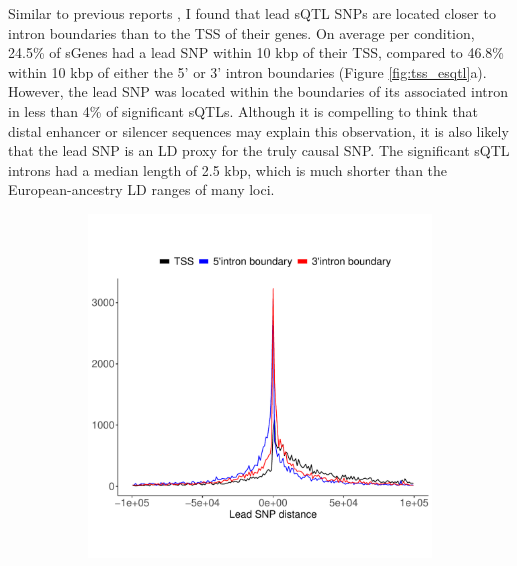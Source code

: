 Similar to previous reports \cite{Garrido-Martin2021-sk}, I found that lead sQTL SNPs are located closer to intron boundaries than to the TSS of their genes. On average per condition, 24.5\% of sGenes had a lead SNP within 10 kbp of their TSS, compared to 46.8\% within 10 kbp of either the 5' or 3' intron boundaries (Figure \ref{fig:tss_esqtl}a). However, the lead SNP was located within the boundaries of its associated intron in less than 4\% of significant sQTLs. Although it is compelling to think that distal enhancer or silencer sequences may explain this observation, it is also likely that the lead SNP is an LD proxy for the truly causal SNP. The significant sQTL introns had a median length of 2.5 kbp, which is much shorter than the European-ancestry LD ranges of many loci. \\
\begin{figure}[H]
  \centering
  \begin{subfigure}[b]{0.45\textwidth}
      \centering
      \includegraphics[width=\textwidth]{intron_tss}
      \caption{}
      \label{fig:intron_tss}
  \end{subfigure}
  \hfill
  \begin{subfigure}[b]{0.45\textwidth}
      \centering

\end{subfigure}
\end{figure}
